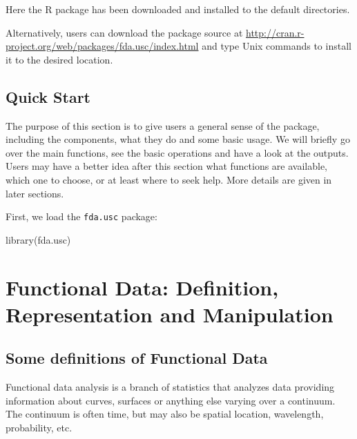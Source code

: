 \documentclass[
]{book}
\newenvironment{Shaded}{\begin{snugshade}}{\end{snugshade}}
\newcommand{\FunctionTok}[1]{\textcolor[rgb]{0.00,0.00,0.00}{#1}}
\newcommand{\NormalTok}[1]{#1}
\begin{document}
Here the R package has been downloaded and installed to the default directories.

Alternatively, users can download the package source at \url{http://cran.r-project.org/web/packages/fda.usc/index.html} and type Unix commands to install it to the desired location.

\hypertarget{quick-start}{%
\section*{Quick Start}\label{quick-start}}

The purpose of this section is to give users a general sense of the package, including the components, what they do and some basic usage. We will briefly go over the main functions, see the basic operations and have a look at the outputs. Users may have a better idea after this section what functions are available, which one to choose, or at least where to seek help. More details are given in later sections.

First, we load the \texttt{fda.usc} package:

\begin{Shaded}
\begin{Highlighting}[]
\FunctionTok{library}\NormalTok{(fda.usc)}
\end{Highlighting}
\end{Shaded}

\newcommand{\lrp}[1]{\left(#1\right)}
\newcommand{\lrc}[1]{\left[#1\right]}
\newcommand{\lrb}[1]{\left\{#1\right\}}

\hypertarget{definition}{%
\chapter{Functional Data: Definition, Representation and Manipulation}\label{definition}}

\hypertarget{some-definitions-of-functional-data}{%
\section{Some definitions of Functional Data}\label{some-definitions-of-functional-data}}

Functional data analysis is a branch of statistics that analyzes data providing information about curves, surfaces or anything else varying over a continuum. The continuum is often time, but may also be spatial location, wavelength, probability, etc.
\end{document}
